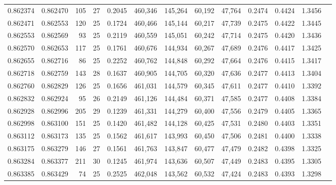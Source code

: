 \begin{tabular}{rrrrrrrrrrrrr}
0.862374 & 0.862470 &   105 &  27 &                                     0.2045 & 460,346 & 145,264 &  60,192 &  47,764 & 0.2474 & 0.4424 & 1.3456 \\
0.862471 & 0.862553 &   120 &  25 &                                     0.1724 & 460,466 & 145,144 &  60,217 &  47,739 & 0.2475 & 0.4422 & 1.3445 \\
0.862553 & 0.862569 &    93 &  25 &                                     0.2119 & 460,559 & 145,051 &  60,242 &  47,714 & 0.2475 & 0.4420 & 1.3436 \\
0.862570 & 0.862653 &   117 &  25 &                                     0.1761 & 460,676 & 144,934 &  60,267 &  47,689 & 0.2476 & 0.4417 & 1.3425 \\
0.862655 & 0.862716 &    86 &  25 &                                     0.2252 & 460,762 & 144,848 &  60,292 &  47,664 & 0.2476 & 0.4415 & 1.3417 \\
0.862718 & 0.862759 &   143 &  28 &                                     0.1637 & 460,905 & 144,705 &  60,320 &  47,636 & 0.2477 & 0.4413 & 1.3404 \\
0.862760 & 0.862829 &   126 &  25 &                                     0.1656 & 461,031 & 144,579 &  60,345 &  47,611 & 0.2477 & 0.4410 & 1.3392 \\
0.862832 & 0.862924 &    95 &  26 &                                     0.2149 & 461,126 & 144,484 &  60,371 &  47,585 & 0.2477 & 0.4408 & 1.3384 \\
0.862928 & 0.862996 &   205 &  29 &                                     0.1239 & 461,331 & 144,279 &  60,400 &  47,556 & 0.2479 & 0.4405 & 1.3365 \\
0.862998 & 0.863100 &   151 &  25 &                                     0.1420 & 461,482 & 144,128 &  60,425 &  47,531 & 0.2480 & 0.4403 & 1.3351 \\
0.863112 & 0.863173 &   135 &  25 &                                     0.1562 & 461,617 & 143,993 &  60,450 &  47,506 & 0.2481 & 0.4400 & 1.3338 \\
0.863175 & 0.863279 &   146 &  27 &                                     0.1561 & 461,763 & 143,847 &  60,477 &  47,479 & 0.2482 & 0.4398 & 1.3325 \\
0.863284 & 0.863377 &   211 &  30 &                                     0.1245 & 461,974 & 143,636 &  60,507 &  47,449 & 0.2483 & 0.4395 & 1.3305 \\
0.863385 & 0.863429 &    74 &  25 &                                     0.2525 & 462,048 & 143,562 &  60,532 &  47,424 & 0.2483 & 0.4393 & 1.3298 \\

\end{tabular}
